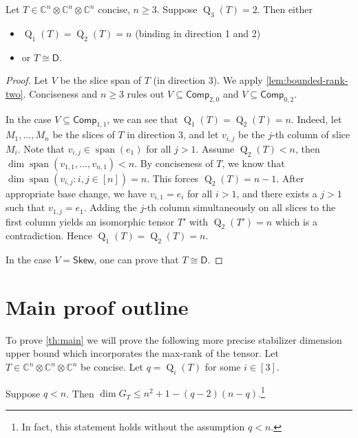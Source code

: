 \documentclass[11pt,a4paper]{article}
\numberwithin{equation}{section}
\DeclareMathOperator{\subrank}{Q}
\newcommand{\CC}{\mathbb{C}}
\DeclareMathOperator{\Q}{Q}
\DeclareMathOperator{\linspan}{span}
\newcommand{\Comp}{\mathsf{Comp}}
\newcommand{\Alt}{\mathsf{Skew}}
\begin{document}
\begin{lemma}\label{lem:max-rank-equals-2}
	Let $T \in \CC^n \otimes \CC^n \otimes \CC^n$ concise, $n \geq 3$. Suppose $\subrank_3(T) = 2$. Then either
	\begin{itemize}
		\item $\subrank_1(T) = \subrank_2(T) = n$ (binding in direction 1 and 2)
		\item or $T \cong \mathsf{D}$.
	\end{itemize}
\end{lemma}
%
\begin{proof}
	Let $V$ be the slice span of $T$ (in direction $3$). We apply \cref{lem:bounded-rank-two}. Conciseness and $n\geq 3$ rules out $V \subseteq \Comp_{2,0}$ and $V \subseteq \Comp_{0,2}$.
    
    In the case $V \subseteq \Comp_{1,1}$, we can see that $\subrank_1(T) = \subrank_2(T) = n$. Indeed, let $M_1, \dots, M_n$ be the slices of $T$ in direction $3$, and let $v_{i,j}$ be the $j$-th column of slice $M_i$. Note that $v_{i,j} \in \linspan (e_1)$ for all $j>1$. Assume $\Q_2(T)<n$, then $\dim \linspan(v_{1,1},\dots,v_{n,1})<n$. By conciseness of $T$, we know that $\dim \linspan(v_{i,j}: i,j \in [n])=n$. This forces $\Q_2(T)=n-1$. After appropriate base change, we have $v_{i,1}=e_i$ for all $i>1$, and there exists a $j>1$ such that $v_{1,j}=e_1$. Adding the $j$-th column simultaneously on all slices to the first column yields an isomorphic tensor $T'$ with $\Q_2(T')=n$ which is a contradiction. Hence $\Q_1(T)=\Q_2(T)=n$. 
    
    In the case $V = \Alt$, one can prove that $T \cong \mathsf{D}$.
\end{proof}

\section{Main proof outline}

To prove \cref{th:main} we will prove the following more precise stabilizer dimension upper bound which incorporates the max-rank of the tensor. 
Let $T \in \CC^n \otimes \CC^n \otimes \CC^n$ be concise. Let $q = \subrank_i(T)$ for some $i \in [3]$.

\begin{theorem}\label{th:stab-dim-max-rank}
Suppose $q < n$. Then $\dim G_T \leq n^2 + 1 - (q-2)(n-q)$.\footnote{In fact, this statement holds without the assumption $q < n$.}
\end{theorem}
\end{document}

